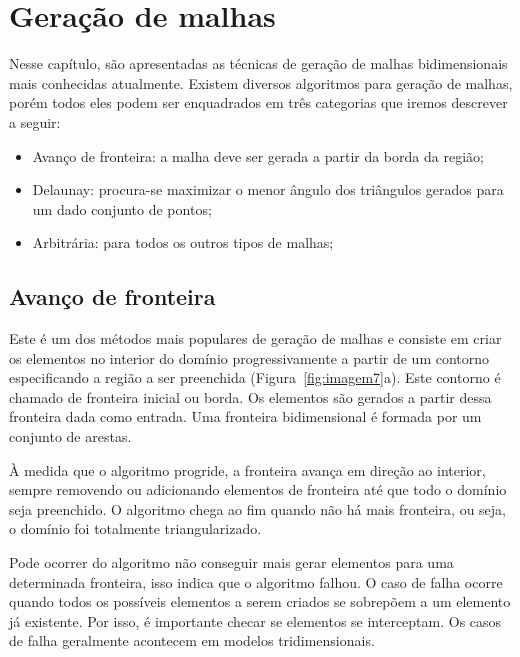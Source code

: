 \pagestyle{empty}
\cleardoublepage
\pagestyle{fancy}

\chapter{Geração de malhas}\label{cap3}

Nesse capítulo, são apresentadas as técnicas de geração de malhas bidimensionais mais conhecidas atualmente. Existem diversos algoritmos para geração de malhas, porém todos eles podem ser enquadrados em três categorias que iremos descrever a seguir:

\begin{itemize}
  \item Avanço de fronteira: a malha deve ser gerada a partir da borda da região;

  \item Delaunay: procura-se maximizar o menor ângulo dos triângulos gerados para um dado conjunto de pontos;

  \item Arbitrária: para todos os outros tipos de malhas;
\end{itemize}

\section{Avanço de fronteira}

Este é um dos métodos mais populares de geração de malhas e consiste em criar os elementos no interior do domínio progressivamente a partir de um contorno especificando a região a ser preenchida (Figura~\ref{fig:imagem7}a). Este contorno é chamado de fronteira inicial ou borda. Os elementos são gerados a partir dessa fronteira dada como entrada. Uma fronteira bidimensional é formada por um conjunto de arestas.

À medida que o algoritmo progride, a fronteira avança em direção ao interior, sempre removendo ou adicionando elementos de fronteira até que todo o domínio seja preenchido. O algoritmo chega ao fim quando não há mais fronteira, ou seja, o domínio foi totalmente triangularizado. 

Pode ocorrer do algoritmo não conseguir mais gerar elementos para uma determinada fronteira, isso indica que o algoritmo falhou. O caso de falha ocorre quando todos os possíveis elementos a serem criados se sobrepõem a um elemento já existente. Por isso, é importante checar se elementos se interceptam. Os casos de falha geralmente acontecem em modelos tridimensionais.

